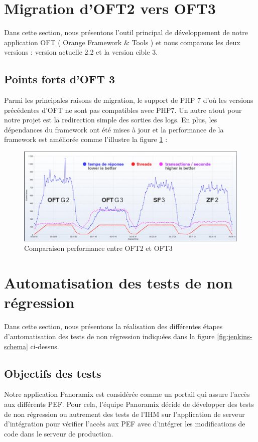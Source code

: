 \section{Migration d’OFT2 vers OFT3}
Dans cette section, nous présentons l’outil principal de développement de notre application OFT ( Orange Framework \& Tools ) et nous comparons les deux versions : version actuelle 2.2 et la version cible 3.
\subsection{Points forts d’OFT 3 }
Parmi les principales raisons de migration, le support de PHP 7 d’où les versions précédentes d’OFT ne sont pas compatibles avec PHP7. Un autre atout pour notre projet est la redirection simple des sorties des logs. En plus, les dépendances du framework ont été mises à jour et la performance de la framework est améliorée comme l'illustre la figure \ref{fig:oft-3} :
\begin{figure}[H]
	\centering
	\includegraphics[width=0.7\linewidth]{img/oft-3}
	\caption[Comparaison performance entre OFT2 et OFT3]{Comparaison performance entre OFT2 et OFT3\cite{oft-doc}}
	\label{fig:oft-3}
\end{figure}
\section[Automatisation des tests de non régression]{Automatisation des tests de non régression}
Dans cette section, nous présentons la réalisation des différentes étapes d’automatisation des tests de non régression indiquées dans la figure \ref{fig:jenkins-schema} ci-dessus.
\subsection{Objectifs des tests}
Notre application Panoramix est considérée comme un portail qui assure l’accès aux différents PEF. Pour cela, l’équipe Panoramix décide de développer des tests de non régression ou autrement des tests de l’IHM sur l’application de serveur d'intégration pour vérifier l’accès aux PEF avec d’intégrer les modifications de code dans le serveur de production.
